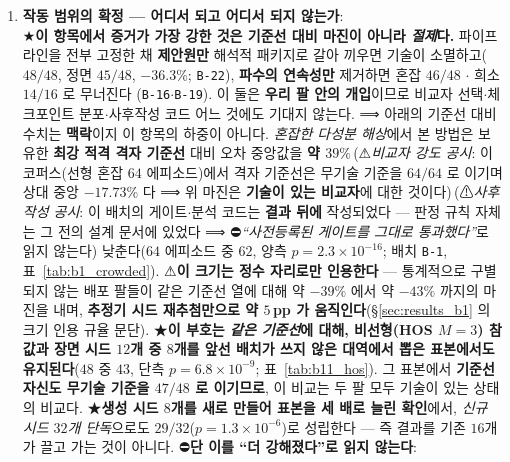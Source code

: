 \documentclass[11pt]{report}
\numberwithin{equation}{chapter}
\numberwithin{figure}{chapter}
\numberwithin{table}{chapter}
\newcommand{\BOnePostHoc}{\,(⚠\emph{사후작성 공시}: 이 배치의 게이트$\cdot$분석
  코드는 \textbf{결과 뒤에} 작성되었다 --- 판정 규칙 자체는 그 전의 설계 문서에
  있었다 ⟹ ⛔\emph{``사전등록된 게이트를 그대로 통과했다''}로 읽지 않는다)}
\newcommand{\CmpSkillBOne}{\,(⚠\emph{비교자 강도 공시}: 이 코퍼스(선형 혼잡 $64$
  에피소드)에서 격자 기준선은 무기술 기준을 $64/64$ 로 이기며 상대 중앙 $-17.73\%$ 다
  ⟹ 위 마진은 \textbf{기술이 있는 비교자}에 대한 것이다)}
\begin{document}
\begin{enumerate}
  \item \textbf{작동 범위의 확정 --- 어디서 되고 어디서 되지 않는가}: \\
        ★\textbf{이 항목에서 증거가 가장 강한 것은 기준선 대비 마진이 아니라
        \emph{절제}다.} 파이프라인을 전부 고정한 채 \textbf{제안원만} 해석적 패키지로 갈아
        끼우면 기술이 소멸하고($48/48$, 정면 $45/48$, $-36.3\%$; \texttt{B-22}),
        \textbf{파수의 연속성만} 제거하면 혼잡 $46/48$ $\cdot$ 희소 $14/16$ 로 무너진다
        (\texttt{B-16}$\cdot$\texttt{B-19}). 이 둘은 \textbf{우리 팔 안의 개입}이므로
        비교자 선택$\cdot$체크포인트 분포$\cdot$사후작성 코드 어느 것에도 기대지 않는다.
        ⟹ 아래의 기준선 대비 수치는 \textbf{맥락}이지 이 항목의 하중이 아니다.
        \emph{혼잡한 다성분 해상}에서 본 방법은 보유한 \textbf{최강 적격 격자 기준선} 대비
        오차 중앙값을 \textbf{약 $39\%$}\CmpSkillBOne{}\BOnePostHoc{} 낮춘다($64$ 에피소드 중 $62$, 양측 $p = 2.3\times10^{-16}$;
        배치 \texttt{B-1}, 표~\ref{tab:b1_crowded}).
        ⚠\textbf{이 크기는 정수 자리로만 인용한다} --- 통계적으로 구별되지 않는 배포 팔들이
        같은 기준선 열에 대해 약 $-39\%$ 에서 약 $-43\%$ 까지의 마진을 내며, \textbf{추정기 시드
        재추첨만으로 약 $5$\,pp 가 움직인다}(\S\ref{sec:results_b1} 의 크기 인용 규율 문단).
        ★\textbf{이 부호는 \emph{같은 기준선}에 대해, 비선형(HOS $M{=}3$) 참값과 장면 시드
        $12$개 중 $8$개를 앞선 배치가 쓰지 않은 대역에서 뽑은 표본에서도 유지된다}($48$ 중 $43$, 단측 $p = 6.8\times10^{-9}$;
        표~\ref{tab:b11_hos}). 그 표본에서 \textbf{기준선 자신도 무기술 기준을 $47/48$ 로
        이기므로}, 이 비교는 두 팔 모두 기술이 있는 상태의 비교다.
        ★\textbf{생성 시드 $8$개를 새로 만들어 표본을 세 배로 늘린 확인}에서, \emph{신규 시드
        $32$개 단독}으로도 $29/32$($p = 1.3\times10^{-6}$)로 성립한다 --- 즉 결과를 기존
        $16$개가 끌고 가는 것이 아니다. ⛔\textbf{단 이를 ``더 강해졌다''로 읽지 않는다}:

\end{enumerate}
\end{document}
